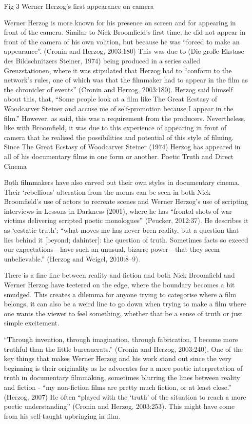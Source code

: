 \documentclass[
  12pt,
]{book}
\begin{document}
Fig 3 Werner Herzog's first appearance on camera

Werner Herzog is more known for his presence on screen and for appearing in front of the camera. Similar to Nick Broomfield's first time, he did not appear in front of the camera of his own volition, but because he was ``forced to make an appearance''. (Cronin and Herzog, 2003:180) This was due to (Die große Ekstase des Bildschnitzers Steiner, 1974) being produced in a series called Grenzstationen, where it was stipulated that Herzog had to ``conform to the network's rules, one of which was that the filmmaker had to appear in the film as the chronicler of events'' (Cronin and Herzog, 2003:180). Herzog said himself about this, that, ``Some people look at a film like The Great Ecstasy of Woodcarver Steiner and accuse me of self-promotion because I appear in the film.'' However, as said, this was a requirement from the producers. Nevertheless, like with Broomfield, it was due to this experience of appearing in front of camera that he realised the possibilities and potential of this style of filming. Since The Great Ecstasy of Woodcarver Steiner (1974) Herzog has appeared in all of his documentary films in one form or another. Poetic Truth and Direct Cinema

Both filmmakers have also carved out their own styles in documentary cinema. Their `rebellious' alteration from the norms can be seen in both Nick Broomfield's use of actors to recreate scenes and Werner Herzog's use of scripting interviews in Lessons in Darkness (2001), where he has ``frontal shots of war victims delivering scripted poetic monologues'' (Peucker, 2012:37). He describes it as `ecstatic truth'; ``what moves me has never been reality, but a question that lies behind it {[}beyond; dahinter{]}: the question of truth. Sometimes facts so exceed our expectations---have such an unusual, bizarre power---that they seem unbelievable.'' (Herzog and Weigel, 2010:8--9).

There is a fine line between reality and fiction and both Nick Broomfield and Werner Herzog have teetered on the edge, where the boundary becomes a bit smudged. This creates a dilemma for anyone trying to categorise where a film belongs, it can also be a weird line to go down when trying to make a film where one wants the viewer to feel something, whether that be a sense of truth or just simple excitement.

``Through invention, through imagination, through fabrication, I become more truthful than the little bureaucrats.'' (Cronin and Herzog, 2003:240), One of the key things that makes Werner Herzog and his work stand out since the very beginning is their originality as he advocates for a more poetic interpretation of truth in documentary filmmaking, sometimes blurring the lines between reality and fiction - ``my non-fiction films are pretty much fiction, or at least close.'' (Herzog, 2007) He often ``played with the `truth' of the situation to reach a more poetic understanding'' (Cronin and Herzog, 2003:253). This might have come from his self-taught upbringing in film.
\end{document}
